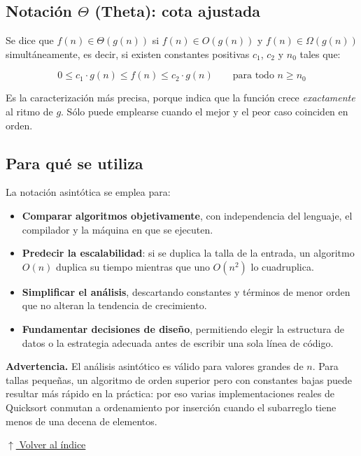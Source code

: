 \documentclass[12pt]{article}
\newcommand{\volverindice}{%
    \vspace{1em}%
    \begin{flushright}%
        \hyperlink{indice}{\small $\uparrow$ Volver al índice}%
    \end{flushright}%
}
\begin{document}
\subsection{Notación $\Theta$ (Theta): cota ajustada}

Se dice que $f(n) \in \Theta(g(n))$ si $f(n) \in O(g(n))$ y $f(n) \in \Omega(g(n))$ simultáneamente, es decir, si existen constantes positivas $c_1$, $c_2$ y $n_0$ tales que:

\[
0 \le c_1 \cdot g(n) \le f(n) \le c_2 \cdot g(n) \qquad \text{para todo } n \ge n_0
\]

Es la caracterización más precisa, porque indica que la función crece \emph{exactamente} al ritmo de $g$. Sólo puede emplearse cuando el mejor y el peor caso coinciden en orden.

\subsection{Para qué se utiliza}

La notación asintótica se emplea para:

\begin{itemize}[leftmargin=2em]
    \item \textbf{Comparar algoritmos objetivamente}, con independencia del lenguaje, el compilador y la máquina en que se ejecuten.
    \item \textbf{Predecir la escalabilidad}: si se duplica la talla de la entrada, un algoritmo $O(n)$ duplica su tiempo mientras que uno $O(n^2)$ lo cuadruplica.
    \item \textbf{Simplificar el análisis}, descartando constantes y términos de menor orden que no alteran la tendencia de crecimiento.
    \item \textbf{Fundamentar decisiones de diseño}, permitiendo elegir la estructura de datos o la estrategia adecuada antes de escribir una sola línea de código.
\end{itemize}

\textbf{Advertencia.} El análisis asintótico es válido para valores grandes de $n$. Para tallas pequeñas, un algoritmo de orden superior pero con constantes bajas puede resultar más rápido en la práctica: por eso varias implementaciones reales de Quicksort conmutan a ordenamiento por inserción cuando el subarreglo tiene menos de una decena de elementos.

\volverindice
\newpage

\end{document}
